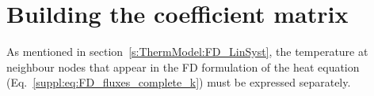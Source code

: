 \section{Building the coefficient matrix}
\label{s:ThermModel:FD_CoeffMatrix}
As mentioned in section~\ref{s:ThermModel:FD_LinSyst}, the temperature at neighbour nodes that appear in the FD formulation of the heat equation (Eq.~\ref{suppl:eq:FD_fluxes_complete_k}) must be expressed separately.





